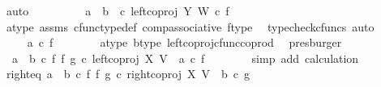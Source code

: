 \begin{isabellebody}
\ auto\isanewline
\ \ \ \ \isamarkupfalse%
\ \isamarkupfalse%
\ {\isachardoublequoteopen}{\isachardot}{\kern0pt}{\isachardot}{\kern0pt}{\isachardot}{\kern0pt}\ {\isacharequal}{\kern0pt}\ {\isacharparenleft}{\kern0pt}{\isacharparenleft}{\kern0pt}a\ {\isasymamalg}\ b{\isacharparenright}{\kern0pt}\ \ {\isasymcirc}\isactrlsub c\ left{\isacharunderscore}{\kern0pt}coproj\ Y\ W{\isacharparenright}{\kern0pt}\ {\isasymcirc}\isactrlsub c\ f{\isachardoublequoteclose}\isanewline
\ \ \ \ \ \ \isamarkupfalse%
\ a{\isacharunderscore}{\kern0pt}type\ assms{\isacharparenleft}{\kern0pt}{}{\isacharparenright}{\kern0pt}\ cfunc{\isacharunderscore}{\kern0pt}type{\isacharunderscore}{\kern0pt}def\ comp{\isacharunderscore}{\kern0pt}associative\ f{\isacharunderscore}{\kern0pt}type\ \isamarkupfalse%
\ {\isacharparenleft}{\kern0pt}typecheck{\isacharunderscore}{\kern0pt}cfuncs{\isacharcomma}{\kern0pt}\ auto{\isacharparenright}{\kern0pt}\isanewline
\ \ \ \ \isamarkupfalse%
\ \isamarkupfalse%
\ {\isachardoublequoteopen}{\isachardot}{\kern0pt}{\isachardot}{\kern0pt}{\isachardot}{\kern0pt}\ {\isacharequal}{\kern0pt}\ {\isacharparenleft}{\kern0pt}a\ {\isasymcirc}\isactrlsub c\ f{\isacharparenright}{\kern0pt}{\isachardoublequoteclose}\isanewline
\ \ \ \ \ \ \isamarkupfalse%
\ a{\isacharunderscore}{\kern0pt}type\ b{\isacharunderscore}{\kern0pt}type\ left{\isacharunderscore}{\kern0pt}coproj{\isacharunderscore}{\kern0pt}cfunc{\isacharunderscore}{\kern0pt}coprod\ \isamarkupfalse%
\ presburger\isanewline
\ \ \ \ \isamarkupfalse%
\ \isamarkupfalse%
\ \ {\isachardoublequoteopen}{\isacharparenleft}{\kern0pt}a\ {\isasymamalg}\ b\ {\isasymcirc}\isactrlsub c\ f\ {\isasymbowtie}\isactrlsub f\ g{\isacharparenright}{\kern0pt}\ {\isasymcirc}\isactrlsub c\ left{\isacharunderscore}{\kern0pt}coproj\ X\ V\ {\isacharequal}{\kern0pt}\ {\isacharparenleft}{\kern0pt}a\ {\isasymcirc}\isactrlsub c\ f{\isacharparenright}{\kern0pt}{\isachardoublequoteclose}\isanewline
\ \ \ \ \ \ \isamarkupfalse%
\ {\isacharparenleft}{\kern0pt}simp\ add{\isacharcolon}{\kern0pt}\ calculation{\isacharparenright}{\kern0pt}\isanewline
\ \ \isamarkupfalse%
\isanewline
\isanewline
\ \ \isamarkupfalse%
\ right{\isacharunderscore}{\kern0pt}eq{\isacharcolon}{\kern0pt}\ {\isachardoublequoteopen}{\isacharparenleft}{\kern0pt}a\ {\isasymamalg}\ b\ {\isasymcirc}\isactrlsub c\ f\ {\isasymbowtie}\isactrlsub f\ g{\isacharparenright}{\kern0pt}\ {\isasymcirc}\isactrlsub c\ right{\isacharunderscore}{\kern0pt}coproj\ X\ V\ {\isacharequal}{\kern0pt}\ {\isacharparenleft}{\kern0pt}b\ {\isasymcirc}\isactrlsub c\ g{\isacharparenright}{\kern0pt}{\isachardoublequoteclose}\isanewline

\end{isabellebody}
